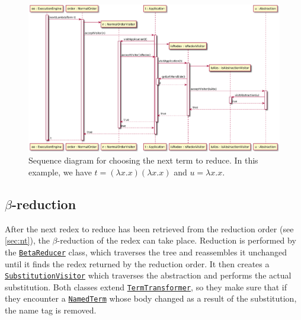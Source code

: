 \begin{figure}[H]
	\centering
	\includegraphics[width=\textwidth]{sequenceDiagrams/nextTerm}
	\caption{Sequence diagram for choosing the next term to reduce. In this example, we have $t = (\lambda x.x)(\lambda x.x)$ and $u = \lambda x.x$.}
\end{figure}


\subsection{$\beta$-reduction}
After the next redex to reduce has been retrieved from the reduction order (see \ref{sec:nt}),
the $\beta$-reduction of the redex can take place. Reduction is performed by the
\texttt{\hyperref[type:edu.kit.wavelength.client.model.term.BetaReducer]{BetaReducer}}
class, which traverses the tree and reassembles it unchanged until it finds the
redex returned by the reduction order. It then creates a
\texttt{\hyperref[type:edu.kit.wavelength.client.model.term.SubstitutionVisitor]{SubstitutionVisitor}}
which traverses the abstraction and performs the actual substitution. Both classes
extend \texttt{\hyperref[type:edu.kit.wavelength.client.model.term.TermTransformer]{TermTransformer}},
so they make sure that if they encounter a \texttt{\hyperref[type:edu.kit.wavelength.client.model.term.NamedTerm]{NamedTerm}}
whose body changed as a result of the substitution, the name tag is removed.


